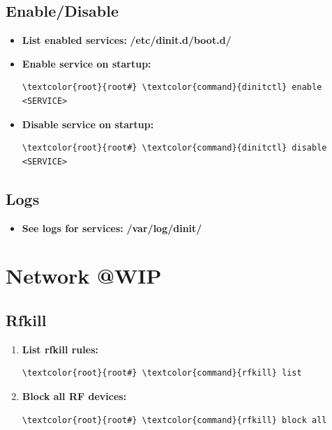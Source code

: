 \documentclass[10pt, a4paper, onecolumn, oneside, titlepage, openany]{book}
\begin{document}
\section{Enable/Disable}
\begin{itemize}
    \item \textbf{List enabled services:}
\newline \textbf{\textcolor{dir}{/etc/dinit.d/boot.d/}}
    \item \textbf{Enable service on startup:}
\begin{Verbatim}[commandchars=\\\{\}]
\textcolor{root}{root#} \textcolor{command}{dinitctl} enable <SERVICE>
\end{Verbatim}
    \item \textbf{Disable service on startup:}
\begin{Verbatim}[commandchars=\\\{\}]
\textcolor{root}{root#} \textcolor{command}{dinitctl} disable <SERVICE>
\end{Verbatim}
\end{itemize}

\section{Logs}
\begin{itemize}
    \item \textbf{See logs for services:}
\newline \textbf{\textcolor{dir}{/var/log/dinit/}}    
\end{itemize}


\chapter{Network @WIP}
\section{Rfkill}
\begin{enumerate}
    \item \textbf{List rfkill rules:}
\begin{Verbatim}[commandchars=\\\{\}]
\textcolor{root}{root#} \textcolor{command}{rfkill} list
\end{Verbatim}    
    \item \textbf{Block all RF devices:}
\begin{Verbatim}[commandchars=\\\{\}]
\textcolor{root}{root#} \textcolor{command}{rfkill} block all
\end{Verbatim}
\end{enumerate}
\end{document}

